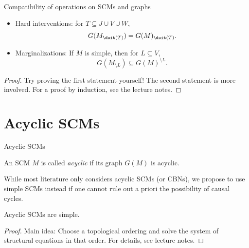 \begin{frame}{Compatibility of operations on SCMs and graphs}
  \begin{Prp}[\ref{prp:compatibility_graph}]
  \begin{itemize}
    \item Hard interventions: for $T \subseteq J \cup V \cup W$,
      $$G(M_{\doit(T)}) = G(M)_{\doit(T)}.$$
    \item Marginalizations: If $M$ is simple, then for $L \subseteq V$,
      $$G(M_{\setminus L}) \subseteq G(M)^{\setminus L}.$$
  \end{itemize}
\end{Prp}
\begin{proof}
Try proving the first statement yourself!
The second statement is more involved. For a proof by induction, see the lecture notes.
\end{proof}
\end{frame}

\part{Acyclic SCMs}
\frame{\partpage}

\begin{frame}{Acyclic SCMs}
  \begin{Def}[\ref{def:scm_acyclic}]
  An SCM $M$ is called \emph{acyclic} if its graph $G(M)$ is acyclic.
\end{Def}
  While most literature only considers acyclic SCMs (or CBNs), we propose to
  use simple SCMs instead if one cannot rule out a priori the possibility of causal cycles.
  \begin{Prp}[\ref{prp:acyclic_scms_are_simple}]
  Acyclic SCMs are simple.
\end{Prp}
\begin{proof}
  Main idea: Choose a topological ordering and solve the system of structural equations in that order.
  For details, see lecture notes.
\end{proof}
\end{frame}


